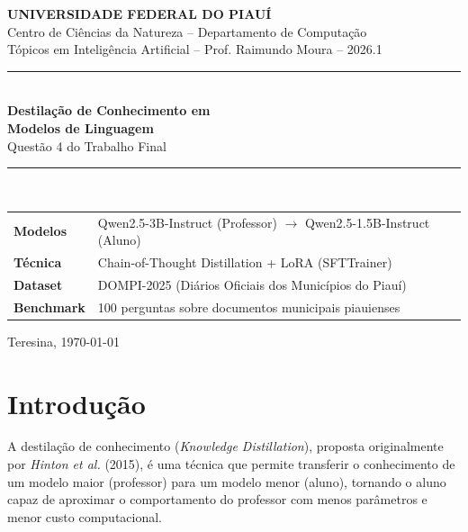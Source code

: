 \documentclass[12pt, a4paper]{article}
\begin{document}

\begin{titlepage}
  \centering
  \vspace*{1cm}
  {\large\bfseries UNIVERSIDADE FEDERAL DO PIAUÍ}\\[0.3cm]
  {\normalsize Centro de Ciências da Natureza -- Departamento de Computação}\\[0.3cm]
  {\normalsize Tópicos em Inteligência Artificial -- Prof. Raimundo Moura -- 2026.1}\\
  \vspace{2cm}
  \rule{\linewidth}{0.5pt}\\[0.4cm]
  {\LARGE\bfseries\color{ufpiblue} Destilação de Conhecimento em\\[0.3cm]
  Modelos de Linguagem}\\[0.3cm]
  {\large Questão 4 do Trabalho Final}\\
  \rule{\linewidth}{0.5pt}\\
  \vspace{1.5cm}
  \begin{tabular}{ll}
    \textbf{Modelos}    & Qwen2.5-3B-Instruct (Professor) $\rightarrow$ Qwen2.5-1.5B-Instruct (Aluno) \\[0.3cm]
    \textbf{Técnica}    & Chain-of-Thought Distillation + LoRA (SFTTrainer) \\[0.3cm]
    \textbf{Dataset}    & DOMPI-2025 (Diários Oficiais dos Municípios do Piauí) \\[0.3cm]
    \textbf{Benchmark}  & 100 perguntas sobre documentos municipais piauienses \\
  \end{tabular}
  \vfill
  {\normalsize Teresina, \today}
\end{titlepage}

\tableofcontents
\newpage

\section{Introdução}


A destilação de conhecimento (\textit{Knowledge Distillation}), proposta originalmente
por \textit{Hinton et al.} (2015), é uma técnica que permite transferir o conhecimento
de um modelo maior (professor) para um modelo menor (aluno), tornando o aluno capaz de
aproximar o comportamento do professor com menos parâmetros e menor custo computacional.
\end{document}
